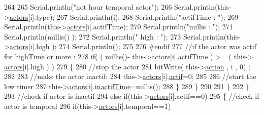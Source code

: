 \begin{DoxyCode}
264                         
265                         Serial.println(\textcolor{stringliteral}{"not hour temporal actor"});
266                         Serial.println(this->\hyperlink{classJetpack_a7e16d2f97837f9712a2e6de1c50d99db}{actors}[i].type);
267                         Serial.println(i);
268                         Serial.println(\textcolor{stringliteral}{"actifTime : "});
269                         Serial.println(this->\hyperlink{classJetpack_a7e16d2f97837f9712a2e6de1c50d99db}{actors}[i].actifTime);
270                         Serial.println(\textcolor{stringliteral}{"millis : "});
271                         Serial.println(millis() );
272                         Serial.println(\textcolor{stringliteral}{" high : "});
273                         Serial.println(this->\hyperlink{classJetpack_a7e16d2f97837f9712a2e6de1c50d99db}{actors}[i].high );
274                         Serial.println();
275                     
276 \textcolor{preprocessor}{                    #endif}
277                         \textcolor{comment}{//if the actor was actif for highTime or more :}
278                         \textcolor{keywordflow}{if}( ( millis()- this->\hyperlink{classJetpack_a7e16d2f97837f9712a2e6de1c50d99db}{actors}[i].actifTime  ) >= ( this->
      \hyperlink{classJetpack_a7e16d2f97837f9712a2e6de1c50d99db}{actors}[i].high  ) )
279                         \{
280                             \textcolor{comment}{//stop the actor}
281                             bitWrite( this->\hyperlink{classJetpack_aca3142925a7b0834b34ae91d26af7765}{action} , i , 0) ;
282 
283                             \textcolor{comment}{//make the actor inactif:}
284                             this->\hyperlink{classJetpack_a7e16d2f97837f9712a2e6de1c50d99db}{actors}[i].\hyperlink{structJetpack_1_1state_aa177541689bbaea21a4650a083b0df77}{actif}=0;
285 
286                             \textcolor{comment}{//start the low timer}
287                             this->\hyperlink{classJetpack_a7e16d2f97837f9712a2e6de1c50d99db}{actors}[i].\hyperlink{structJetpack_1_1state_aaf817b1f9e7a4d65b9e3ca4726b281f6}{inactifTime}=millis();              
288                         \}
289                     \}           
290                             
291                 \}
292             \}
293             \textcolor{comment}{//check if actor is inactif}
294             \textcolor{keywordflow}{else} \textcolor{keywordflow}{if}(this->\hyperlink{classJetpack_a7e16d2f97837f9712a2e6de1c50d99db}{actors}[i].actif==0)
295             \{   \textcolor{comment}{//check if actor is temporal}
296                 \textcolor{keywordflow}{if}(this->\hyperlink{classJetpack_a7e16d2f97837f9712a2e6de1c50d99db}{actors}[i].temporal==1)

\end{DoxyCode}
